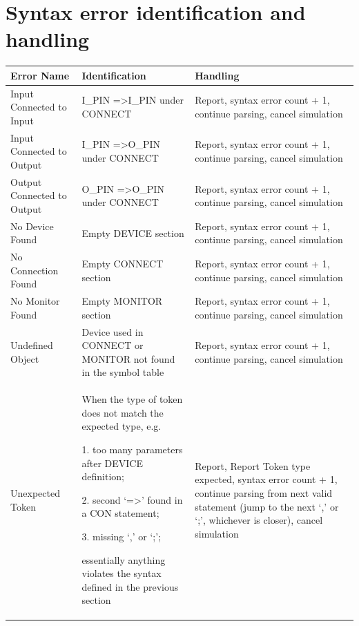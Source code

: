 \documentclass[12pt]{article}
\begin{document}
\section{Syntax error identification and handling}
\begin{center}
	\begin{tabular}{|m{3cm} | m{6cm} | m{6cm} |}
		\hline
		Error Name & Identification & Handling \\
		\hline
		Input Connected to Input & I\_PIN =\textgreater  I\_PIN under CONNECT &  Report, syntax error count + 1, continue parsing, cancel simulation \\
		\hline
		Input Connected to Output & I\_PIN =\textgreater  O\_PIN under CONNECT &  Report, syntax error count + 1, continue parsing, cancel simulation \\
		\hline
		Output Connected to Output & O\_PIN =\textgreater  O\_PIN under CONNECT &  Report, syntax error count + 1, continue parsing, cancel simulation \\
		\hline
		No Device Found & Empty DEVICE section & Report, syntax error count + 1, continue parsing, cancel simulation \\
		\hline
		No Connection Found & Empty CONNECT section & Report, syntax error count + 1, continue parsing, cancel simulation \\
		\hline
		No Monitor Found & Empty MONITOR section & Report, syntax error count + 1, continue parsing, cancel simulation \\
		\hline
		Undefined Object & Device used in CONNECT or MONITOR not found in the symbol table & Report, syntax error count + 1, continue parsing, cancel simulation \\
		\hline
		Unexpected Token & When the type of token does not match the expected type, e.g. 
		
		1. too many parameters after DEVICE definition; 
		
		2. second `=\textgreater' found in a CON statement; 
		
		3. missing `,' or `;';  
		
		essentially anything violates the syntax defined in the previous section
		& Report, Report Token type expected,  syntax error count + 1, continue parsing from next valid statement (jump to the next `,' or `;', whichever is closer), cancel simulation \\
		\hline
	
	\end{tabular}
\end{center}
\newpage
\end{document}
